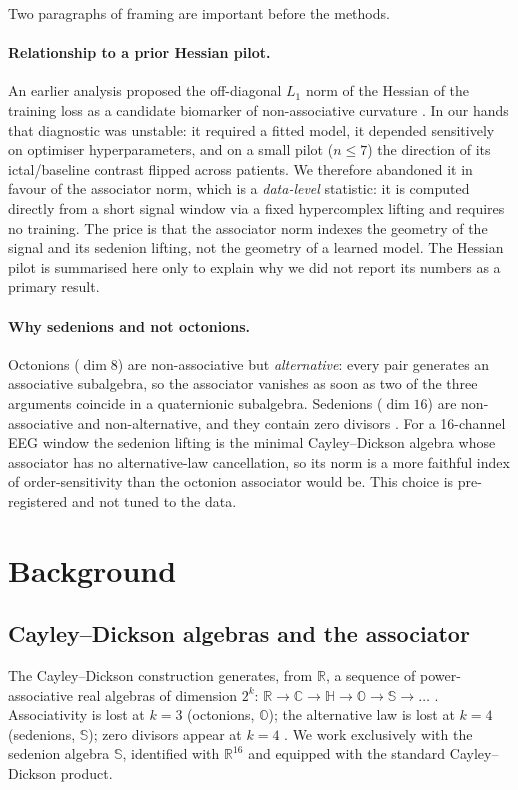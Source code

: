 \documentclass[11pt,twocolumn]{article}
\begin{document}
Two paragraphs of framing are important before the methods.

\paragraph{Relationship to a prior Hessian pilot.}
An earlier analysis proposed the off-diagonal $L_1$ norm of the
Hessian of the training loss as a candidate biomarker of
non-associative curvature \cite{agourakis2026hessian_pilot}. In our
hands that diagnostic was unstable: it required a fitted model, it
depended sensitively on optimiser hyperparameters, and on a small
pilot ($n\le7$) the direction of its ictal/baseline contrast flipped
across patients. We therefore abandoned it in favour of the associator
norm, which is a \emph{data-level} statistic: it is computed directly
from a short signal window via a fixed hypercomplex lifting and
requires no training. The price is that the associator norm indexes
the geometry of the signal and its sedenion lifting, not the geometry
of a learned model. The Hessian pilot is summarised here only to
explain why we did not report its numbers as a primary result.

\paragraph{Why sedenions and not octonions.}
Octonions ($\dim 8$) are non-associative but \emph{alternative}: every
pair generates an associative subalgebra, so the associator vanishes
as soon as two of the three arguments coincide in a quaternionic
subalgebra. Sedenions ($\dim 16$) are non-associative and
non-alternative, and they contain zero divisors
\cite{moreno1998zero,imaeda2000}. For a 16-channel EEG window the
sedenion lifting is the minimal Cayley--Dickson algebra whose
associator has no alternative-law cancellation, so its norm is a more
faithful index of order-sensitivity than the octonion associator
would be. This choice is pre-registered and not tuned to the data.

\section{Background}

\subsection{Cayley--Dickson algebras and the associator}
The Cayley--Dickson construction generates, from $\mathbb{R}$, a
sequence of power-associative real algebras of dimension $2^k$:
$\mathbb{R}\to\mathbb{C}\to\mathbb{H}\to\mathbb{O}\to\mathbb{S}\to\ldots$
\cite{schafer1966}. Associativity is lost at $k=3$ (octonions,
$\mathbb{O}$); the alternative law is lost at $k=4$ (sedenions,
$\mathbb{S}$); zero divisors appear at $k=4$
\cite{moreno1998zero,kinyon2004zero}. We work exclusively with the
sedenion algebra $\mathbb{S}$, identified with $\mathbb{R}^{16}$ and
equipped with the standard Cayley--Dickson product.
\end{document}

